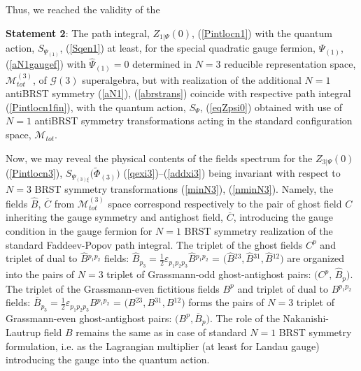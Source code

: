 \documentclass[10pt]{article}
\begin{document}
 Thus, we  reached  the validity of the

 \noindent
 {\textbf{Statement 2}}: The path integral, ${Z}_{1|\Psi}(0)$,  (\ref{Pintlocn1}) with the quantum action,  $S_{\Psi_{(1)}}$, (\ref{Sqen1}) at least, for the special quadratic gauge fermion, $ \Psi_{(1)}$, (\ref{aN1gaugef})  with $\widehat{\Psi}_{(1)}=0$ determined in $N=3$ reducible representation space, $\mathcal{M}^{(3)}_{tot}$,  of $\mathcal{G}(3)$ superalgebra,  but with realization of the additional $N=1$ antiBRST symmetry (\ref{aN1}), (\ref{abrstrans})  coincide with respective path integral (\ref{Pintlocn1fin}),  with the quantum action, $S_{\Psi}$, (\ref{eqZpsi0}) obtained with use of $N=1$ antiBRST symmetry transformations acting in the standard  configuration space, $\mathcal{M}_{tot}$.

 Now, we may reveal the physical contents of the fields spectrum for the $  {Z}_{3|\Psi}(0)$ (\ref{Pintlocn3}),  $
  S_{\Psi_{(3)\xi}}\big(\widetilde{\Phi}_{(3)}\big) $ (\ref{qexi3})--(\ref{addxi3}) being invariant with respect to $N=3$ BRST symmetry transformations (\ref{minN3}), (\ref{nminN3}).
  Namely, the fields $\widehat{B}$,   $\overline{C}$ from $\mathcal{M}_{tot}^{(3)}$ space  correspond respectively to  the pair of ghost field $C$ inheriting the gauge symmetry    and antighost field, $\overline{C}$, introducing the gauge condition in the gauge fermion for $N=1$ BRST symmetry realization of the standard Faddeev-Popov path integral. The triplet of the ghost fields $C^p$ and triplet of dual to $\widehat{B}{}^{p_1p_2}$ fields: $\widehat{B}_{p_3}=\frac{1}{2}\varepsilon_{p_1p_2p_3}\widehat{B}{}^{p_1p_2}$ = $\big(\widehat{B}{}^{23},\widehat{B}{}^{31},\widehat{B}{}^{12}\big)$ are organized into the pairs of $N=3$ triplet of Grassmann-odd ghost-antighost pairs: $\big(C^p,\,\widehat{B}_p\big)$. The triplet of the Grassmann-even fictitious fields
  $B^p$ and triplet of dual to ${B}{}^{p_1p_2}$ fields: $\overline{B}_{p_3}=\frac{1}{2}\varepsilon_{p_1p_2p_3}{B}{}^{p_1p_2}$ = $\big({B}{}^{23},{B}{}^{31},{B}{}^{12}\big)$ forms the pairs of $N=3$ triplet  of Grassmann-even ghost-antighost pairs: $\big({B}^p,  \overline{B}_p\big)$.
  The role of the Nakanishi-Lautrup field $B$  remains the same as in case of standard $N=1$ BRST symmetry formulation, i.e. as the Lagrangian multiplier (at least for Landau gauge) introducing the gauge into the quantum action.
\end{document}
